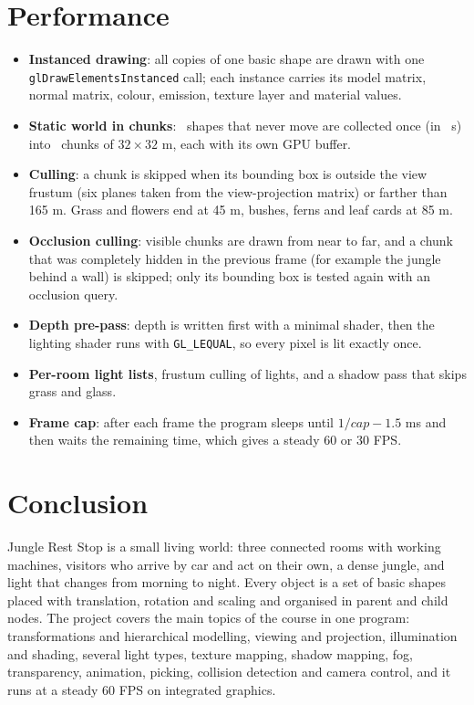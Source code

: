\section{Performance}
\begin{itemize}
  \item \textbf{Instanced drawing}: all copies of one basic shape are drawn with one \texttt{glDrawElementsInstanced}
        call; each instance carries its model matrix, normal matrix, colour, emission, texture layer and material values.
  \item \textbf{Static world in chunks}: \statStaticInstances\ shapes that never move are collected once (in
        \statBuildSeconds\ s) into \statChunks\ chunks of $32\times32$ m, each with its own GPU buffer.
  \item \textbf{Culling}: a chunk is skipped when its bounding box is outside the view frustum (six planes taken from
        the view-projection matrix) or farther than 165 m. Grass and flowers end at 45 m, bushes, ferns and leaf cards at 85 m.
  \item \textbf{Occlusion culling}: visible chunks are drawn from near to far, and a chunk that was completely hidden in the
        previous frame (for example the jungle behind a wall) is skipped; only its bounding box is tested again with an
        occlusion query.
  \item \textbf{Depth pre-pass}: depth is written first with a minimal shader, then the lighting shader runs with
        \texttt{GL\_LEQUAL}, so every pixel is lit exactly once.
  \item \textbf{Per-room light lists}, frustum culling of lights, and a shadow pass that skips grass and glass.
  \item \textbf{Frame cap}: after each frame the program sleeps until $1/cap - 1.5$ ms and then waits the remaining time,
        which gives a steady 60 or 30 FPS.
\end{itemize}
\begin{table}[H]
\centering\small
\caption{Measured frame time without the frame cap (1280$\times$720, Intel Iris Xe)}

\end{table}

\section{Conclusion}
Jungle Rest Stop is a small living world: three connected rooms with working machines, visitors who arrive by car and
act on their own, a dense jungle, and light that changes from morning to night. Every object is a set of basic shapes
placed with translation, rotation and scaling and organised in parent and child nodes. The project covers the main
topics of the course in one program: transformations and hierarchical modelling, viewing and projection,
illumination and shading, several light types, texture mapping, shadow mapping, fog, transparency, animation,
picking, collision detection and camera control, and it runs at a steady 60 FPS on integrated graphics.

